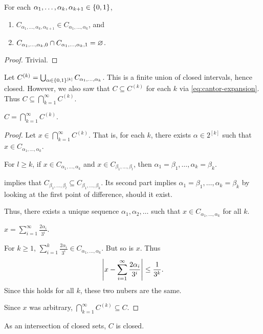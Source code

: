 \begin{lemma} \label{thm:cantor-descent}
    For each $\alpha_1, \dots, \alpha_k, \alpha_{k+1} \in \{0, 1\}$,
    \begin{enumerate}
        \item $C_{\alpha_1, \dots, \alpha_k, \alpha_{k+1}} \in
            C_{\alpha_1, \dots, \alpha_k}$, and
        \item $C_{\alpha_1, \dots, \alpha_k, 0} \cap
            C_{\alpha_1, \dots, \alpha_k, 1} = \varnothing$.
    \end{enumerate}
\end{lemma}
\begin{proof}
    Trivial.
\end{proof}

Let $C^{(k)} = \bigcup_{\alpha \in \{0, 1\}^{[k]}} C_{\alpha_1, \dots, \alpha_k}$.
This is a finite union of closed intervals, hence closed.
However, we also saw that $C \subseteq C^{(k)}$ for each $k$ via
\cref{eq:cantor-expansion}.
Thus $C \subseteq \bigcap_{k=1}^\infty C^{(k)}$.
\begin{proposition}
    $C = \bigcap_{k=1}^\infty C^{(k)}$.
\end{proposition}
\begin{proof}
    Let $x \in \bigcap_{k=1}^\infty C^{(k)}$.
    That is, for each $k$, there exists $\alpha \in 2^{[k]}$ such that
    $x \in C_{\alpha_1, \dots, \alpha_k}$.
    \begin{claim}
        For $l \ge k$, if $x \in C_{\alpha_1, \dots, \alpha_k}$ and
        $x \in C_{\beta_1, \dots, \beta_l}$, then
        $\alpha_1 = \beta_1, \dots, \alpha_k = \beta_k$.
    \end{claim}
    \begin{subproof}
         implies that
        $C_{\beta_1, \dots, \beta_l} \subseteq C_{\beta_1, \dots, \beta_k}$.
        Its second part implies $\alpha_1 = \beta_1, \dots, \alpha_k = \beta_k$
        by looking at the first point of difference, should it exist.
    \end{subproof}
    Thus, there exists a unique sequence $\alpha_1, \alpha_2, \dots$ such
    that $x \in C_{\alpha_1, \dots, \alpha_k}$ for all $k$.
    \begin{claim}
        $x = \sum_{i=1}^\infty \frac{2\alpha_i}{3^i}$.
    \end{claim}
    \begin{subproof}
        For $k \ge 1$, $\sum_{i=1}^k \frac{2\alpha_i}{3^i} \in
        C_{\alpha_1, \dots, \alpha_k}$.
        But so is $x$.
        Thus \[
            \abs*{x - \sum_{i=1}^\infty \frac{2\alpha_i}{3^i}}
                \le \frac1{3^k}.
        \] Since this holds for all $k$, these two nubers are the same.
    \end{subproof}
    Since $x$ was arbitrary, $\bigcap_{k=1}^\infty C^{(k)} \subseteq C$.
\end{proof}
\begin{corollary}
    As an intersection of closed sets, $C$ is closed.
\end{corollary}


